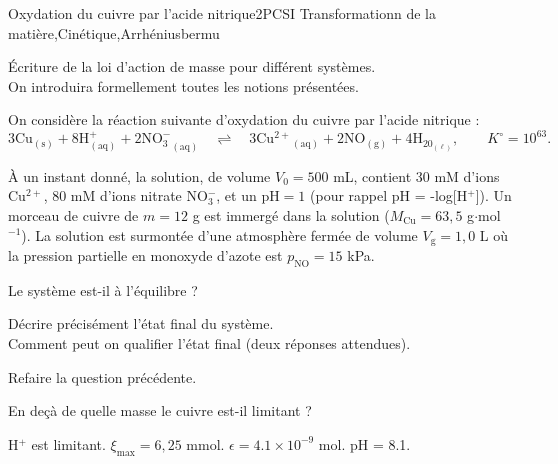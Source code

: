 
\begin{exercise}{Oxydation du cuivre par l'acide nitrique}{2}{PCSI}
{Transformationn de la matière,Cinétique,Arrhénius}{bermu}

\begin{questions}
\questioncours \'Ecriture de la loi d'action de masse pour différent systèmes. \\
On introduira formellement toutes les notions présentées.

\begin{EnvUplevel}
 On considère la réaction suivante d'oxydation du cuivre par l'acide nitrique :
 $$\mathrm{3 Cu_{(s)} + 8 H^+_{(aq)} + 2 {NO_3^-}_{(aq)} \quad\rightleftharpoons\quad 3 {Cu^{2+}}_{(aq)} + 2 NO_{(g)} + 4 H_20_{(\ell)}}, \qquad K^\circ = 10^{63}.$$
 
 À un instant donné, la solution, de volume $V_0 = 500$ mL, contient 30 mM d’ions Cu$^{2+}$, 80 mM d'ions nitrate NO$_3^-$, et un pH$ = 1$ (pour rappel pH = -log[H$^+$]). Un morceau de cuivre de $m = 12$ g est immergé dans  la solution ($M_\text{Cu} = 63,5$ g$\cdot$mol$^{-1}$). La solution est surmontée d’une atmosphère fermée de volume $V_\text{g} = 1,0$ L où la pression partielle en monoxyde d’azote est $p_\text{NO} = 15$ kPa.
\end{EnvUplevel}

    \question Le système est-il à l'équilibre ?
 
    \question Décrire précisément l’état final du système. \\
 Comment peut on qualifier l'état final (deux réponses attendues).
 
 
    \question Refaire la question précédente.
 
    \question En deçà de quelle masse le cuivre est-il limitant ?
 
 
 

\end{questions}


\end{exercise}

\begin{solution}

H$^+$ est limitant. $\xi_\text{max} = 6,25$ mmol. $\epsilon = 4.1\times 10^{-9}$ mol. pH = 8.1.

\end{solution}